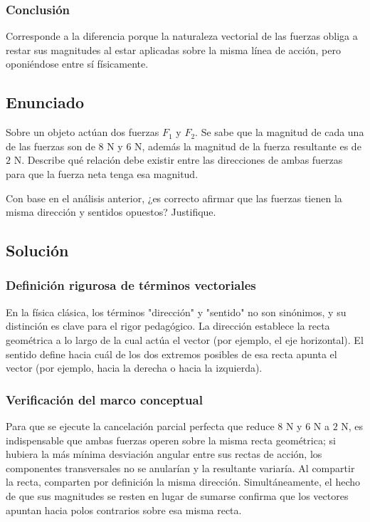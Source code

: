 \documentclass[12pt, a4paper]{article}
\begin{document}
\subsubsection*{Conclusión}
Corresponde a la diferencia porque la naturaleza vectorial de las fuerzas obliga a restar sus magnitudes al estar aplicadas sobre la misma línea de acción, pero oponiéndose entre sí físicamente.

\newpage

\subsection*{Enunciado}
Sobre un objeto actúan dos fuerzas $F_1$ y $F_2$. Se sabe que la magnitud de cada una de las fuerzas son de $8 \text{ N}$ y $6 \text{ N}$, además la magnitud de la fuerza resultante es de $2 \text{ N}$. Describe qué relación debe existir entre las direcciones de ambas fuerzas para que la fuerza neta tenga esa magnitud.

Con base en el análisis anterior, ¿es correcto afirmar que las fuerzas tienen la misma dirección y sentidos opuestos? Justifique.

\subsection*{Solución}

\subsubsection*{Definición rigurosa de términos vectoriales}
En la física clásica, los términos "dirección" y "sentido" no son sinónimos, y su distinción es clave para el rigor pedagógico. La dirección establece la recta geométrica a lo largo de la cual actúa el vector (por ejemplo, el eje horizontal). El sentido define hacia cuál de los dos extremos posibles de esa recta apunta el vector (por ejemplo, hacia la derecha o hacia la izquierda).

\subsubsection*{Verificación del marco conceptual}
Para que se ejecute la cancelación parcial perfecta que reduce $8 \text{ N}$ y $6 \text{ N}$ a $2 \text{ N}$, es indispensable que ambas fuerzas operen sobre la misma recta geométrica; si hubiera la más mínima desviación angular entre sus rectas de acción, los componentes transversales no se anularían y la resultante variaría. Al compartir la recta, comparten por definición la misma dirección. Simultáneamente, el hecho de que sus magnitudes se resten en lugar de sumarse confirma que los vectores apuntan hacia polos contrarios sobre esa misma recta.
\end{document}
